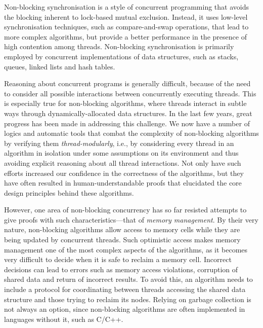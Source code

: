 Non-blocking synchronisation is a style of concurrent programming that
avoids the blocking inherent to lock-based mutual exclusion. Instead, it uses
low-level synchronisation techniques, such as compare-and-swap operations, that
lead to more complex algorithms, but provide a better performance in the
presence of high contention among threads. Non-blocking synchronisation is
primarily employed by concurrent implementations of data structures, such as
stacks, queues, linked lists and hash tables.


Reasoning about concurrent programs is generally difficult, because of the need
to consider all possible interactions between concurrently executing threads.
This is especially true for non-blocking algorithms, where threads interact in
subtle ways through dynamically-allocated data structures. In the last few
years, great progress has been made in addressing this challenge. We now have
a number of logics %
and automatic tools %
that combat the complexity of
non-blocking algorithms by verifying them {\em thread-modularly}, i.e., by
considering every thread in an algorithm in isolation under some assumptions on
its environment and thus avoiding explicit reasoning about all thread
interactions. Not only have such efforts increased our confidence in the
correctness of the algorithms, but they have often resulted in
human-understandable proofs that elucidated the core design principles behind
these algorithms.

However, one area of non-blocking concurrency has so far resisted attempts to
give proofs with such characteristics---that of {\em memory
  management}. By their very nature, non-blocking algorithms allow access to
memory cells while they are being updated by concurrent threads.  Such
optimistic access makes memory management one of the most complex aspects of the
algorithms, as it becomes very difficult to decide when it is safe
to reclaim a memory cell. Incorrect decisions can lead to errors such as memory
access violations, corruption of shared data and return of incorrect results.
To avoid this, an algorithm needs to include a protocol for coordinating between
threads accessing the shared data structure and those trying to reclaim its
nodes. Relying on garbage collection is not always an option, since non-blocking
algorithms are often implemented in languages without it, such as C/C++.

